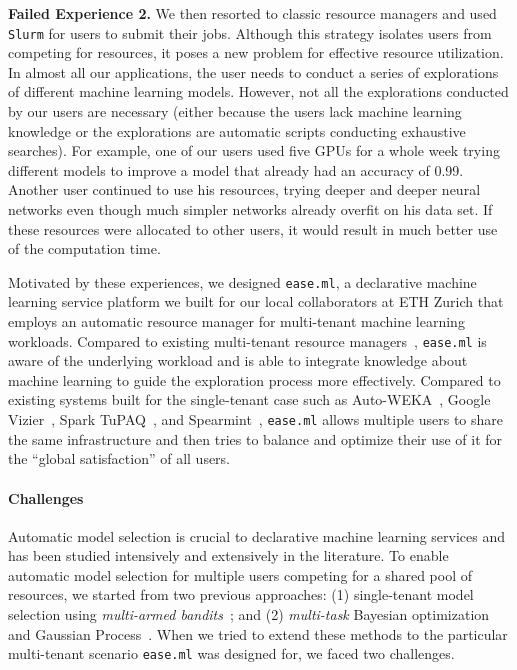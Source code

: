 \documentclass[letterpaper]{vldb}
\newcommand{\eml}{\texttt{ease.ml}\xspace}
\begin{document}
\vspace{0.1em}
\noindent
{\bf Failed Experience 2.} We then resorted to classic resource
managers and used \texttt{Slurm} for users to submit 
their jobs. 
Although this strategy isolates
users from competing for resources, it poses a
new problem for effective resource utilization.
In almost all our applications, the user needs to conduct 
a series of explorations of different machine learning
models.
However, not all the explorations conducted by
our users are necessary (either because the users lack
machine learning knowledge or the explorations are automatic 
scripts conducting exhaustive searches). For example,
one of our users used five GPUs for a whole week
trying different models to improve
a model that already had an accuracy of 0.99.
Another user 
continued to use his resources, trying deeper and 
deeper neural networks even though much simpler
networks already overfit on his data set.
If these resources were allocated to other users,
it would result in much better use of the computation time.

\vspace{0.1em}
Motivated by these experiences, we designed
\eml, a declarative machine learning service platform we built for our local collaborators at ETH Zurich
that employs an automatic resource manager for multi-tenant machine learning workloads.
Compared to existing multi-tenant 
resource managers~\cite{DavidShue2012,JonathanMace2015,Krebs2014},
\eml is aware of the underlying workload and is able to
integrate knowledge about machine learning
to guide the exploration process more effectively.
Compared to existing systems built for the
single-tenant case
such as Auto-WEKA~\cite{Kotthoff2017,Thornton2013}, 
Google Vizier~\cite{Golovin2017}, Spark TuPAQ~\cite{Sparks2015}, and Spearmint~\cite{Snoek2012}, \eml allows multiple users to share the same
infrastructure and then tries to balance and optimize their use of it for
the ``global satisfaction'' of all users.

\vspace{-0.5em}
\paragraph*{Challenges}

Automatic model selection is crucial to declarative machine learning services 
and has been studied intensively and extensively in the literature.
To enable automatic model selection for multiple users
competing for a shared pool of resources,
we started from two previous approaches:
(1) single-tenant model selection using 
\emph{multi-armed bandits}~\cite{Feurer2015,Golovin2017,Kotthoff2017,Snoek2012,Sparks2015};
and (2) {\em multi-task} Bayesian optimization
and Gaussian Process~\cite{Bardenet2013,Hutter2011,Swersky2013}.
When we tried to extend these methods to the particular multi-tenant scenario \eml was designed for,
we faced two challenges.
\end{document}
